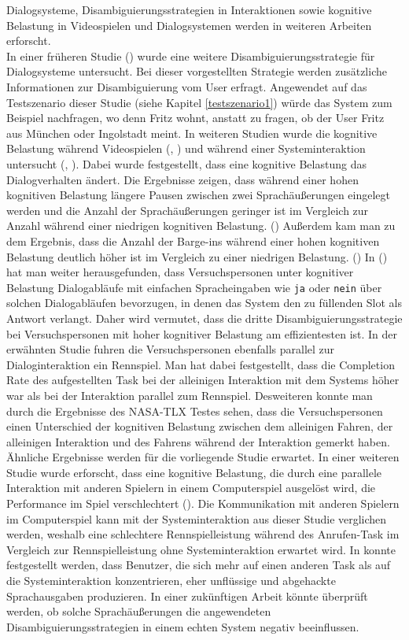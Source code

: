 \documentclass[12pt,a4paper]{scrartcl}
\begin{document}
Dialogsysteme, Disambiguierungsstrategien in Interaktionen sowie kognitive Belastung in Videospielen und Dialogsystemen werden in weiteren Arbeiten erforscht. \\
In einer früheren Studie (\cite{idsia}) wurde eine weitere Disambiguierungsstrategie für Dialogsysteme untersucht. Bei dieser vorgestellten Strategie werden zusätzliche Informationen zur Disambiguierung vom User erfragt. Angewendet auf das Testszenario dieser Studie (siehe Kapitel \ref{testszenario1}) würde das System zum Beispiel nachfragen, wo denn Fritz wohnt, anstatt zu fragen, ob der User Fritz aus München oder Ingolstadt meint.
In weiteren Studien wurde die kognitive Belastung während Videospielen (\cite{CLmmorpg}, \cite{eCLDS}) und während einer Systeminteraktion untersucht (\cite{DbCL}, \cite{eCLDS}). Dabei wurde festgestellt, dass eine kognitive Belastung das Dialogverhalten ändert. Die Ergebnisse zeigen, dass während einer hohen kognitiven Belastung längere Pausen zwischen zwei Sprachäußerungen eingelegt werden und die Anzahl der Sprachäußerungen  geringer ist im Vergleich zur Anzahl während einer niedrigen kognitiven Belastung. (\cite{DbCL}) Außerdem kam man zu dem Ergebnis, dass die Anzahl der Barge-ins während einer hohen kognitiven Belastung deutlich höher ist im Vergleich zu einer niedrigen Belastung. (\cite{eCLDS})
In (\cite{eCLDS}) hat man weiter herausgefunden, dass Versuchspersonen unter kognitiver Belastung Dialogabläufe mit einfachen Spracheingaben wie \texttt{ja} oder \texttt{nein} über solchen Dialogabläufen bevorzugen, in denen das System den zu füllenden Slot als Antwort verlangt. Daher wird vermutet, dass die dritte Disambiguierungsstrategie bei Versuchspersonen mit hoher kognitiver Belastung am effizientesten ist.  In der erwähnten Studie fuhren die Versuchspersonen ebenfalls parallel zur Dialoginteraktion ein Rennspiel. Man hat dabei festgestellt, dass die Completion Rate des aufgestellten Task bei der alleinigen Interaktion mit dem Systems höher war als bei der Interaktion parallel zum Rennspiel. Desweiteren konnte man durch die Ergebnisse des NASA-TLX Testes sehen, dass die Versuchspersonen einen Unterschied der kognitiven Belastung zwischen dem alleinigen Fahren, der alleinigen Interaktion und des Fahrens während der Interaktion gemerkt haben. Ähnliche Ergebnisse werden für die vorliegende Studie erwartet.
In einer weiteren Studie wurde erforscht, dass eine kognitive Belastung, die durch eine parallele Interaktion mit anderen Spielern in einem Computerspiel ausgelöst wird, die Performance im Spiel verschlechtert (\cite{CLmmorpg}). Die Kommunikation mit anderen Spielern im Computerspiel kann mit der Systeminteraktion aus dieser Studie verglichen werden, weshalb eine schlechtere Rennspielleistung während des Anrufen-Task im Vergleich zur Rennspielleistung ohne Systeminteraktion erwartet wird. In \cite{Wozhcd} konnte festgestellt werden, dass Benutzer, die sich mehr auf einen anderen Task als auf die Systeminteraktion konzentrieren, eher unflüssige und abgehackte Sprachausgaben produzieren. In einer zukünftigen Arbeit könnte überprüft werden, ob solche Sprachäußerungen die angewendeten Disambiguierungsstrategien in einem echten System negativ beeinflussen.
\end{document}
